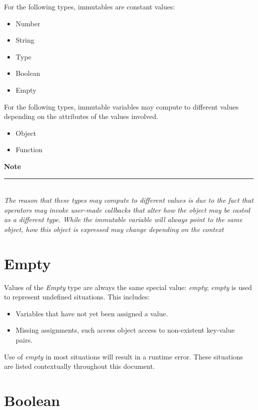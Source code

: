 \documentclass[12pt,letterpaper]{report}
\newcommand{\noteline}{\noindent\textbf{Note}\\\noindent\rule{5cm}{0.4pt}\\}
\begin{document}
For the following types, immutables are constant values:
\begin{itemize}
  \item Number 
  \item String 
  \item Type
  \item Boolean
  \item Empty 
\end{itemize}

For the following types, immutable variables may compute to different values depending on the attributes of the values involved.
\begin{itemize}
  \item Object 
  \item Function  
\end{itemize}



\noteline
\textit{
The reason that these types may compute to different values is due to the fact that operators may invoke user-made callbacks that 
alter how the object may be casted as a different type. While the immutable variable will always point to 
the same object, how this object is expressed may change depending on the context
}






\section{Empty}\label{Empty}

Values of the \textit{Empty} type are always the same special value: \textit{empty};
\textit{empty} is used to represent undefined situations. This includes:

\begin{itemize}
  \item Variables that have not yet been assigned a value.
  \item Missing assignments, such access object access to non-existent key-value pairs.
\end{itemize}

Use of \textit{empty} in most situations will result in a runtime error. These situations 
are listed contextually throughout this document.




\section{Boolean}\label{Boolean}
\end{document}
